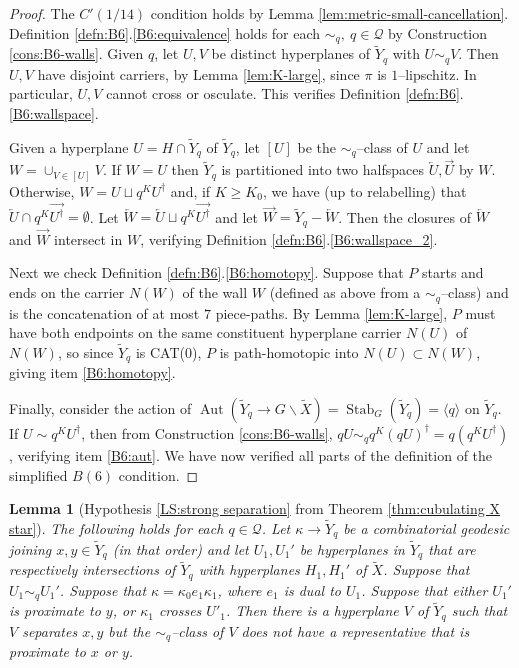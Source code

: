 \documentclass[11pt,oneside]{amsart}
\newtheorem{lem}[thm]{Lemma}
\theoremstyle{definition}
\DeclareMathOperator{\Aut}{Aut}
\DeclareMathOperator{\stabilizer}{Stab}
\newcommand{\OL}{\overleftarrow}
\newcommand{\OR}{\overrightarrow}
\begin{document}
\begin{proof}
The $C'(1/14)$ condition holds by Lemma \ref{lem:metric-small-cancellation}.  Definition \ref{defn:B6}.\eqref{B6:equivalence} holds for each $\sim_q,\ q\in\mathcal Q$ by Construction \ref{cons:B6-walls}.  Given $q$, let $U,V$ be distinct hyperplanes of $\widetilde Y_q$ with $U\sim_qV$.  Then $U,V$ have disjoint carriers, by Lemma \ref{lem:K-large}, since $\pi$ is $1$--lipschitz.  In particular, $U,V$ cannot cross or osculate.  This verifies Definition \ref{defn:B6}.\eqref{B6:wallspace}.

Given a hyperplane $U=H\cap\widetilde Y_q$ of $\widetilde Y_q$, let $[U]$ be the $\sim_q$--class of $U$ and let $W=\cup_{V\in[U]}V$.  If $W=U$ then $\widetilde Y_q$ is partitioned into two halfspaces $\OL U,\OR U$ by $W$.  Otherwise, $W=U \sqcup q^KU^\dagger$ and, if $K\geq K_0$, we have (up to relabelling) that $\OL U \cap q^K\OR{U^\dagger}=\emptyset$.  Let $\OL W=\OL U\sqcup q^K\OR{U^\dagger}$ and let $\OR W=\widetilde Y_q-\OL W$.  Then the closures of $\OL W$ and $\OR W$ intersect in $W$, verifying Definition \ref{defn:B6}.\eqref{B6:wallspace_2}.

Next we check Definition \ref{defn:B6}.\eqref{B6:homotopy}.  Suppose that $P$ starts and ends on the carrier $N(W)$ of the wall $W$ (defined as above from a $\sim_q$--class) and is the concatenation of at most $7$ piece-paths.  By Lemma \ref{lem:K-large}, $P$ must have both endpoints on the same constituent hyperplane carrier $N(U)$ of $N(W)$, so since $\widetilde Y_q$ is CAT(0), $P$ is path-homotopic into $N(U)\subset N(W)$, giving item \eqref{B6:homotopy}.

Finally, consider the action of $\Aut(\widetilde Y_q\to G\backslash\widetilde X)=\stabilizer_G(\widetilde Y_q)=\langle q\rangle$ on $\widetilde Y_q$.  If $U\sim q^KU^\dagger$, then from Construction \ref{cons:B6-walls}, $qU\sim_q q^K(qU)^\dagger=q(q^KU^\dagger)$, verifying item \eqref{B6:aut}.  We have now verified all parts of the definition of the simplified $B(6)$ condition.
\end{proof}

\begin{lem}[Hypothesis \eqref{LS:strong separation} from Theorem \ref{thm:cubulating X star}]\label{lem:exits-strong-separation}
The following holds for each $q\in\mathcal Q$.  Let $\kappa\to\widetilde Y_q$ be a combinatorial geodesic joining $x,y\in\widetilde Y_q$ (in that order) and let $U_1,U_1'$ be hyperplanes in $\widetilde Y_q$ that are respectively intersections of $\widetilde Y_q$ with hyperplanes $H_1,H_1'$ of $\widetilde X$.  Suppose that $U_1\sim_q U_1'$.  Suppose that $\kappa= \kappa_0e_1\kappa_1$, where $e_1$ is dual to $U_1$.  Suppose that either $U_1'$ is proximate to $y$, or $\kappa_1$ crosses $U'_1$.  Then there is a hyperplane $V$ of $\widetilde Y_q$ such that $V$ separates $x,y$ but the $\sim_q$--class of $V$ does not have a representative that is proximate to $x$ or $y$. 
\end{lem}
\end{document}
